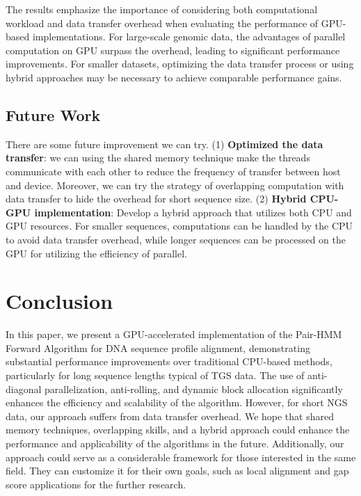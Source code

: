 \documentclass[PhD]{PHlab-thesis}
\begin{document}
The results emphasize the importance of considering both computational workload and data transfer overhead when evaluating the performance of GPU-based implementations. For large-scale genomic data, the advantages of parallel computation on GPU surpass the overhead, leading to significant performance improvements. For smaller datasets, optimizing the data transfer process or using hybrid approaches may be necessary to achieve comparable performance gains.

\section{Future Work}
There are some future improvement we can try. (1) \textbf{Optimized the data transfer}: we can using the shared memory technique make the threads communicate with each other to reduce the frequency of transfer between host and device. Moreover, we can try the strategy of overlapping computation with data transfer to hide the overhead for short sequence size.
(2) \textbf{Hybrid CPU-GPU implementation}: Develop a hybrid approach that utilizes both CPU and GPU resources. For smaller sequences, computations can be handled by the CPU to avoid data transfer overhead, while longer sequences can be processed on the GPU for utilizing the efficiency of parallel.

\chapter{Conclusion}
In this paper, we present a GPU-accelerated implementation of the Pair-HMM Forward Algorithm for DNA sequence profile alignment, demonstrating substantial performance improvements over traditional CPU-based methods, particularly for long sequence lengths typical of TGS data. The use of anti-diagonal parallelization, anti-rolling, and dynamic block allocation significantly enhances the efficiency and scalability of the algorithm. However, for short NGS data, our approach suffers from data transfer overhead. We hope that shared memory techniques, overlapping skills, and a hybrid approach could enhance the performance and applicability of the algorithms in the future. Additionally, our approach could serve as a considerable framework for those interested in the same field. They can customize it for their own goals, such as local alignment and gap score applications for the further research.
\newpage
{}
\printbibliography
\end{document}
